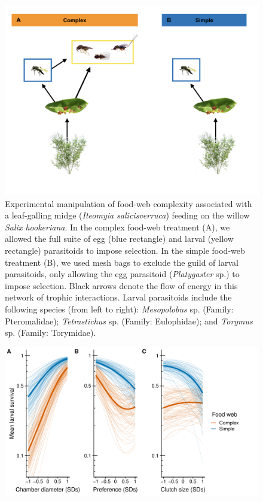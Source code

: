 \documentclass[11pt,]{article}
\begin{document}
\begin{figure}
\centering
\includegraphics{analyses/complex_simple_foodwebs.jpeg}
\caption{\label{fig:Conceptual}Experimental manipulation of food-web
complexity associated with a leaf-galling midge (\emph{Iteomyia
salicisverruca}) feeding on the willow \emph{Salix hookeriana}. In the
complex food-web treatment (A), we allowed the full suite of egg (blue
rectangle) and larval (yellow rectangle) parasitoids to impose
selection. In the simple food-web treatment (B), we used mesh bags to
exclude the guild of larval parasitoids, only allowing the egg
parasitoid (\emph{Platygaster} sp.) to impose selection. Black arrows
denote the flow of energy in this network of trophic interactions.
Larval parasitoids include the following species (from left to right):
\emph{Mesopolobus} sp. (Family: Pteromalidae); \emph{Tetrastichus} sp.
(Family: Eulophidae); and \emph{Torymus} sp. (Family: Torymidae).}
\end{figure}

\begin{figure}
\centering
\includegraphics{analyses/UV_landscapes.pdf}
\caption{\label{fig:UV_Landscape}}
\end{figure}
\end{document}
